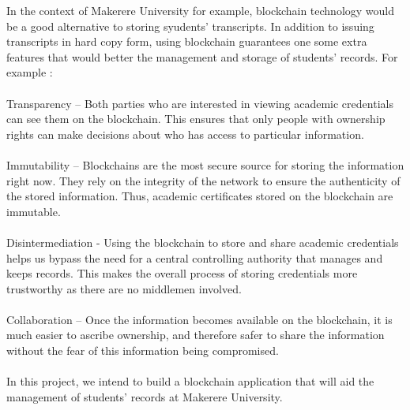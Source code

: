 In the context of Makerere University for example, blockchain technology would be a good alternative to storing syudents' transcripts. In addition to issuing transcripts in hard copy form, using blockchain guarantees one some extra features that would better the management and storage of students' records. For example \cite{art2} :\\\\
Transparency – Both parties who are interested in viewing academic credentials can see them on the  blockchain. This ensures that only people with ownership rights can make decisions about who has access to particular information.\\\\
Immutability – Blockchains are the most secure source for storing the information right now. They rely on the integrity of the network to ensure the authenticity of the stored information. Thus, academic certificates stored on the blockchain are immutable.\\\\
Disintermediation - Using the blockchain to store and share academic credentials helps us bypass the need for a central controlling authority that manages and keeps records. This makes the overall process of storing credentials more trustworthy as there are no middlemen involved.\\\\
Collaboration – Once the information becomes available on the blockchain, it is much easier to ascribe ownership, and therefore safer to share the information without the fear of this information being compromised.\\\\
In this project, we intend to build a blockchain application that will aid the management of students' records at Makerere University. 

